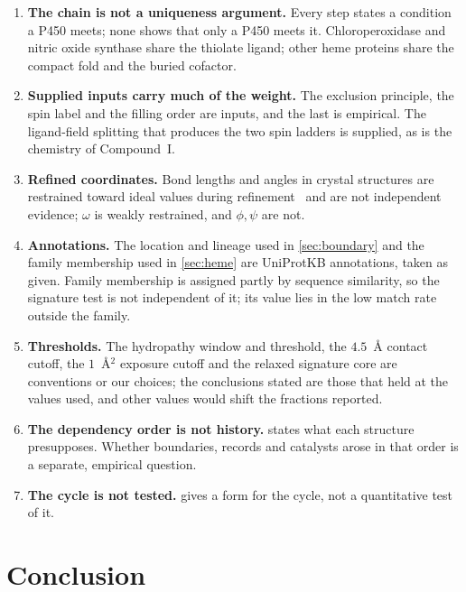 \documentclass[10pt,twocolumn,a4paper]{article}
\begin{document}
\begin{enumerate}[label=(\arabic*)]
\item \textbf{The chain is not a uniqueness argument.} Every step states a
condition a P450 meets; none shows that only a P450 meets it. Chloroperoxidase
and nitric oxide synthase share the thiolate ligand; other heme proteins share
the compact fold and the buried cofactor.
\item \textbf{Supplied inputs carry much of the weight.} The exclusion
principle, the spin label and the filling order are inputs, and the last is
empirical. The ligand-field splitting that produces the two spin ladders is
supplied, as is the chemistry of Compound~I.
\item \textbf{Refined coordinates.} Bond lengths and angles in crystal
structures are restrained toward ideal values during
refinement~\citep{engh1991} and are not independent evidence; $\omega$ is
weakly restrained, and $\phi,\psi$ are not.
\item \textbf{Annotations.} The location and lineage used in
\cref{sec:boundary} and the family membership used in \cref{sec:heme} are
UniProtKB annotations, taken as given. Family membership is assigned partly
by sequence similarity, so the signature test is not independent of it; its
value lies in the low match rate outside the family.
\item \textbf{Thresholds.} The hydropathy window and threshold, the
$4.5$~\AA{} contact cutoff, the $1$~\AA$^2$ exposure cutoff and the relaxed
signature core are conventions or our choices; the conclusions stated
are those that held at the values used, and other values would shift the
fractions reported.
\item \textbf{The dependency order is not history.}  states
what each structure presupposes. Whether boundaries, records and catalysts
arose in that order is a separate, empirical question.
\item \textbf{The cycle is not tested.}  gives a form for the
cycle, not a quantitative test of it.
\end{enumerate}

\section{Conclusion}
\label{sec:conclusion}
\end{document}
